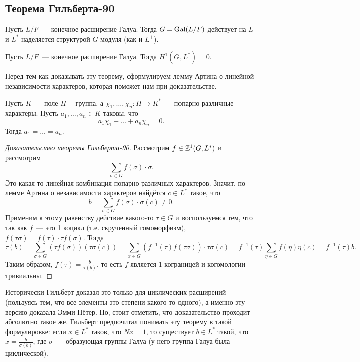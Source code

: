 
	\subsection{Теорема Гильберта-90}

	Пусть $L/F$~--- конечное расширение Галуа. Тогда $G = \operatorname{Gal}(L/F)$ действует на $L$ и $L^*$ наделяется структурой $G$-модуля (как и $L^+$).

	\begin{theorem}[Hilbert-90] 
		Пусть $L/F$~--- конечное расширение Галуа. Тогда $H^{1}(G, L^*) = 0$.
	\end{theorem}

	Перед тем как доказывать эту теорему, сформулируем лемму Артина о линейной независимости характеров, которая поможет нам при доказательстве. 

	\begin{lemma}[Артин] 
		Пусть $K$~--- поле $H$~-- группа, а $\chi_1, \ldots, \chi_n\colon H \to K^*$~--- попарно-различные характеры. Пусть $a_1, \ldots, a_n \in K$ таковы, что 
		\[
			a_1 \chi_1 + \ldots + a_n \chi_n = 0.
		\]
		Тогда $a_1 = \ldots = a_n$.
	\end{lemma}

	\begin{proof}[Доказательство теоремы Гильберта-90]
		 Рассмотрим $f \in \mathbb{Z}^1(G, L^*)$ и рассмотрим 
		 \[
		 	\sum_{\sigma \in G} f(\sigma) \cdot \sigma.
		 \]
		 Это какая-то линейная комбинация попарно-различных характеров. Значит, по лемме Артина о независимости характеров найдётся $c \in L^*$ такое, что 
		 \[
		 	b = \sum_{\sigma \in G} f(\sigma) \cdot \sigma(c) \neq 0.
		 \]
		 Применим к этому равенству действие какого-то $\tau \in G$ и воспользуемся тем, что так как $f$~--- это 1 коцикл (т.е. скрученный гомоморфизм), $f(\tau \sigma) = f(\tau) \cdot \tau f(\sigma)$. Тогда 
		 \[
		 	\tau(b) = \sum_{\sigma \in G} (\tau f(\sigma)) (\tau \sigma(c)) = \sum_{x \in G} (f^{-1}(\tau)  f(\tau \sigma)) \cdot \tau\sigma(c) = f^{-1}(\tau) \sum_{\eta \in G} f(\eta) \eta(c) = f^{-1}(\tau) b.
		 \]
		 Таким образом, $f(\tau) = \frac{b}{\tau(b)}$, то есть $f$ является 1-кограницей и когомологии тривиальны. 
	\end{proof}

	\begin{remark}
		Исторически Гильберт доказал это только для циклических расширений (пользуясь тем, что все элементы это степени какого-то одного), а именно эту версию доказала Эмми Нётер. Но, стоит отметить, что доказательство проходит абсолютно такое же. Гильберт предпочитал понимать эту теорему в такой формулировке: если $x \in L^*$ таков, что $N x = 1$, то существует $b \in L^*$ такой, что $x = \frac{b}{\sigma(b)}$, где $\sigma$~--- образующая группы Галуа (у него группа Галуа была циклической). 
	\end{remark}


